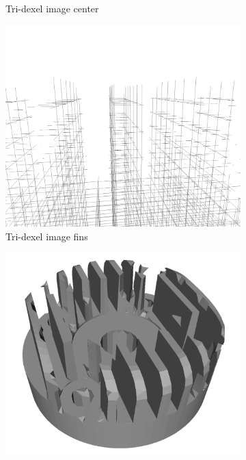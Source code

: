 \begin{figure}
\begin{subfigure}[t]{0.3\textwidth}
		\caption{Tri-dexel image center}
		\label{fig:cylinder_head_dexel_image_center}
	\end{subfigure}
	\begin{subfigure}[t]{0.3\textwidth}
		\centering
		\includegraphics[width=\textwidth]{images/cylinder_head_dexel_image_fins}
		\caption{Tri-dexel image fins}
		\label{fig:cylinder_head_dexel_image_fins}
	\end{subfigure}
	\begin{subfigure}[t]{0.3\textwidth}
		\centering
		\includegraphics[width=\textwidth]{images/cylinder_head_reconstructed}

\end{subfigure}
\end{figure}
